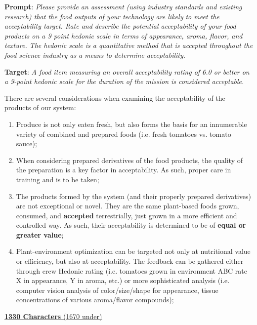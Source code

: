 \documentclass{report}
\begin{document}
\textbf{Prompt}: \textit{Please provide an assessment (using industry standards and existing research) that the food outputs of your technology are likely to meet the acceptability target. Rate and describe the potential acceptability of your food products on a 9 point hedonic scale in terms of appearance, aroma, flavor, and texture. The hedonic scale is a quantitative method that is accepted throughout the food science industry as a means to determine acceptability.}

\textbf{Target}: \textit{A food item measuring an overall acceptability rating of 6.0 or better on a 9-point hedonic scale for the duration of the mission is considered acceptable.}


There are several considerations when examining the acceptability of the products of our system:

\begin{enumerate}
    \item Produce is not only eaten fresh, but also forms the basis for an innumerable variety of combined and prepared foods (i.e. fresh tomatoes vs. tomato sauce);
    \item When considering prepared derivatives of the food products, the quality of the preparation is a key factor in acceptability. As such, proper care in training and is to be taken;
    \item The products formed by the system (and their properly prepared derivatives) are not exceptional or novel. They are the same plant-based foods grown, consumed, and \textbf{accepted} terrestrially, just grown in a more efficient and controlled way. As such, their acceptability is determined to be of \textbf{equal or greater value};
    \item Plant-environment optimization can be targeted not only at nutritional value or efficiency, but also at acceptability. The feedback can be gathered either through crew Hedonic rating (i.e. tomatoes grown in environment ABC rate X in appearance, Y in aroma, etc.) or more sophisticated analysis (i.e. computer vision analysis of color/size/shape for appearance, tissue concentrations of various aroma/flavor compounds); %
\end{enumerate}

\uline{\textbf{1330 Characters} (1670 under)}

\end{document}

